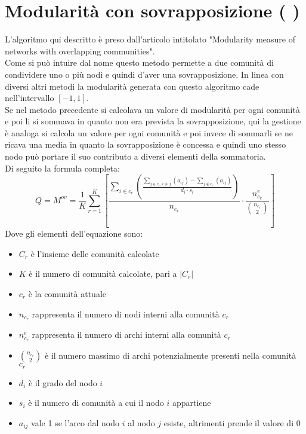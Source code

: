 \section{Modularità con sovrapposizione ( \mover )}
L'algoritmo qui descritto è preso dall'articolo intitolato "Modularity measure of networks with overlapping communities"\cite{M-over_paper}.\\
Come si può intuire dal nome questo metodo permette a due comunità di condividere uno o più nodi e quindi d'aver una sovrapposizione. In linea con diversi altri metodi la modularità generata con questo algoritmo cade nell'intervallo $[-1, 1]$.\\
Se nel metodo precedente si calcolava un valore di modularità per ogni comunità e poi li si sommava in quanto non era prevista la sovrapposizione, qui la gestione è analoga si calcola un valore per ogni comunità e poi invece di sommarli se ne ricava una media in quanto la sovrapposizione è concessa e quindi uno stesso nodo può portare il suo contributo a diversi elementi della sommatoria.\\
Di seguito la formula completa:
\begin{equation}
	Q = M^{ov} = \frac{1}{K} 
	\sum_{r=1}^{K} \left[
		\frac
			{\sum\limits_{i \in c_r} 
				\left( \frac
					{
						\sum\limits_{j \in c_r, i \neq j} \left( a_{ij} \right) 
						- 
						\sum\limits_{j \notin c_r} \left( a_{ij} \right) 
					} 
					{d_i \cdot s_i} 
				\right) } 
			{n_{c_r}}
		\cdot
		\frac{ n^e_{c_r} }{ \binom{n_{c_r}}{2} } 
	\right]
	\label{eq:m_over}
\end{equation}
Dove gli elementi dell'equazione sono:
\begin{itemize}
	\item $C_r$ è l'insieme delle comunità calcolate
	\item $K$ è il numero di comunità calcolate, pari a $|C_r|$
	\item $c_r$ è la comunità attuale
	\item $n_{c_r}$ rappresenta il numero di nodi interni alla comunità $c_r$
	\item $n^e_{c_r}$ rappresenta il numero di archi interni alla comunità $c_r$
	\item $\binom{n_{c_r}}{2}$ è il numero massimo di archi potenzialmente presenti nella comunità $c_r$
	\item $d_i$ è il grado del nodo $i$
	\item $s_i$ è il numero di comunità a cui il nodo $i$ appartiene
	\item $a_{ij}$ vale 1 se l'arco dal nodo $i$ al nodo $j$ esiste, altrimenti prende il valore di 0
\end{itemize}
